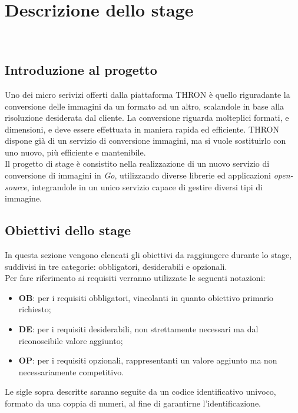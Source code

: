 \chapter{Descrizione dello stage}
\label{cap:descrizione-stage}

\\

\section{Introduzione al progetto}
Uno dei micro serivizi offerti dalla piattaforma THRON è quello riguradante la
conversione delle immagini da un formato ad un altro, scalandole in base alla
risoluzione desiderata dal cliente. La conversione riguarda molteplici formati,
e dimensioni, e deve essere effettuata in maniera rapida ed efficiente.
THRON dispone già di un servizio di conversione immagini, ma si vuole
sostituirlo con uno nuovo, più efficiente e mantenibile. \\
Il progetto di stage è consistito nella realizzazione di un nuovo servizio di
conversione di immagini in \emph{Go}, utilizzando diverse librerie ed
applicazioni \emph{\glsfirstoccur\gls{open-source}}, integrandole in un unico servizio
capace di gestire diversi tipi di immagine.\\

\section{Obiettivi dello stage}
\label{sec:obiettivi}
In questa sezione vengono elencati gli obiettivi da raggiungere durante lo
stage, suddivisi in tre categorie: obbligatori, desiderabili e opzionali.\\
Per fare riferimento ai requisiti verranno utilizzate le seguenti notazioni:
\begin{itemize}
    \item \textbf{OB}: per i requisiti obbligatori, vincolanti in quanto obiettivo
          primario richiesto;
    \item \textbf{DE}: per i requisiti desiderabili, non strettamente necessari
          ma dal riconoscibile valore aggiunto;
    \item \textbf{OP}: per i requisiti opzionali, rappresentanti un valore
          aggiunto ma non necessariamente competitivo.
\end{itemize}
Le sigle sopra descritte saranno seguite da un codice identificativo univoco,
formato da una coppia di numeri, al fine di garantirne l'identificazione.\\
